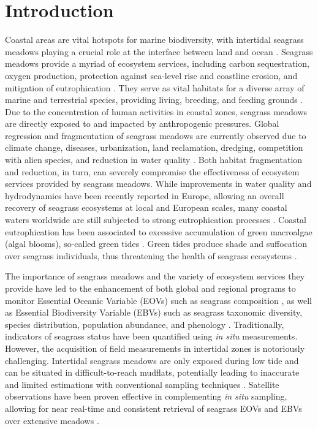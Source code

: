 \documentclass[
  number]{elsarticle}
\begin{document}
\section{Introduction}\label{introduction}

Coastal areas are vital hotspots for marine biodiversity, with
intertidal seagrass meadows playing a crucial role at the interface
between land and ocean \citep{unsworth2022}. Seagrass meadows provide a
myriad of ecosystem services, including carbon sequestration, oxygen
production, protection against sea-level rise and coastline erosion, and
mitigation of eutrophication \citep{unsworth2022, sousa2019blue}. They
serve as vital habitats for a diverse array of marine and terrestrial
species, providing living, breeding, and feeding grounds
\citep{gardner2018, Zoffoli2022, jankowska2019}. Due to the
concentration of human activities in coastal zones, seagrass meadows are
directly exposed to and impacted by anthropogenic pressures. Global
regression and fragmentation of seagrass meadows are currently observed
due to climate change, diseases, urbanization, land reclamation,
dredging, competition with alien species, and reduction in water quality
\citep{nguyen2021, soissons2018, orth2006, lin2018, duffy2019, rasheed2011long, chefaoui2018dramatic, sousa2019blue}.
Both habitat fragmentation and reduction, in turn, can severely
compromise the effectiveness of ecosystem services provided by seagrass
meadows. While improvements in water quality and hydrodynamics have been
recently reported in Europe, allowing an overall recovery of seagrass
ecosystems at local and European scales, many coastal waters worldwide
are still subjected to strong eutrophication processes
\citep{deSantos2019, Zoffoli2021, sousa2019blue}. Coastal eutrophication
has been associated to excessive accumulation of green macroalgae (algal
blooms), so-called green tides \citep{devlin2023nutrients}. Green tides
produce shade and suffocation over seagrass individuals, thus
threatening the health of seagrass ecosystems \citep{wang2022}.

The importance of seagrass meadows and the variety of ecosystem services
they provide have led to the enhancement of both global and regional
programs to monitor Essential Oceanic Variable (EOVs) such as seagrass
composition \citep{Miloslavich2018}, as well as Essential Biodiversity
Variable (EBVs) such as seagrass taxonomic diversity, species
distribution, population abundance, and phenology \citep{Pereira2013}.
Traditionally, indicators of seagrass status have been quantified using
\emph{in situ} measurements. However, the acquisition of field
measurements in intertidal zones is notoriously challenging. Intertidal
seagrass meadows are only exposed during low tide and can be situated in
difficult-to-reach mudflats, potentially leading to inaccurate and
limited estimations with conventional sampling techniques
\citep{nijland2019}. Satellite observations have been proven effective
in complementing \emph{in situ} sampling, allowing for near real-time
and consistent retrieval of seagrass EOVs and EBVs over extensive
meadows
\citep{Zoffoli2021, xu2021, Traganos2018, coffer2023, davies2024intertidal, davies2024sentinel}.
\end{document}

